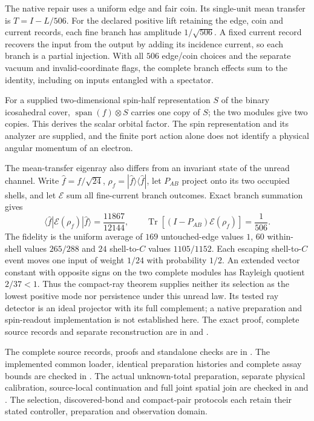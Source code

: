 The native repair uses a uniform edge and fair coin. Its single-unit mean
transfer is $T=I-L/506$. For the declared positive lift retaining the
edge, coin and current records, each fine branch has amplitude
$1/\sqrt{506}$. A fixed current record recovers the input from the
output by adding its incidence current, so each branch is a partial
injection. With all $506$ edge/coin choices and the separate vacuum and
invalid-coordinate flags, the complete branch effects sum to the
identity, including on inputs entangled with a spectator.

For a supplied two-dimensional spin-half representation $S$ of the binary
icosahedral cover, $\operatorname{span}(f)\otimes S$ carries one copy of
$S$; the two modules give two copies. This derives the scalar orbital
factor. The spin representation and its analyzer are supplied, and the
finite port action alone does not identify a physical angular momentum
of an electron.

The mean-transfer eigenray also differs from an invariant state of the
unread channel. Write $\widehat f=f/\sqrt{24}$,
$\rho_f=|\widehat f\rangle\langle\widehat f|$, let $P_{AB}$ project
onto its two occupied shells, and let $\mathcal E$ sum all fine-current
branch outcomes. Exact branch summation gives
\[
 \langle\widehat f|\mathcal E(\rho_f)|\widehat f\rangle
   =\frac{11867}{12144},\qquad
 \operatorname{Tr}\!\left[(I-P_{AB})\mathcal E(\rho_f)\right]
   =\frac1{506}.
\]
The fidelity is the uniform average of $169$ untouched-edge values $1$,
$60$ within-shell values $265/288$ and $24$ shell-to-$C$ values
$1105/1152$. Each escaping shell-to-$C$ event moves one input of weight
$1/24$ with probability $1/2$. An extended vector constant with opposite
signs on the two complete modules has Rayleigh quotient $2/37<1$.
Thus the compact-ray theorem supplies neither its selection as the
lowest positive mode nor persistence under this unread law. Its tested
ray detector is an ideal projector with its full complement; a native
preparation and spin-readout implementation is not established here.
The exact proof, complete source records and separate reconstruction are
in  and
.

The complete source records, proofs and standalone checks are in
. The implemented common loader,
identical preparation histories and complete assay bounds are checked in
. The actual unknown-total
preparation, separate physical calibration, source-local continuation and
full joint spatial join are checked in
 and
.
The selection, discovered-bond
and compact-pair protocols each retain their stated controller,
preparation and observation domain.
